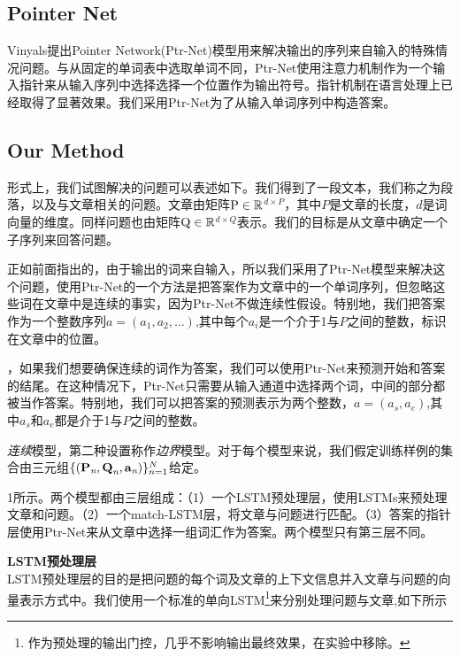 \documentclass{article}
\begin{document}
\begin{CJK*}{UTF8}{gbsn}
\begin{figure*}[!thbp]
    \end{figure*}
    
    \subsection{Pointer Net}
    Vinyals提出Pointer Network(Ptr-Net)模型用来解决输出的序列来自输入的特殊情况问题。与从固定的单词表中选取单词不同，Ptr-Net使用注意力机制作为一个输入指针来从输入序列中选择选择一个位置作为输出符号。指针机制在语言处理上已经取得了显著效果。我们采用Ptr-Net为了从输入单词序列中构造答案。

    \subsection{Our Method}
    形式上，我们试图解决的问题可以表述如下。我们得到了一段文本，我们称之为段落，以及与文章相关的问题。文章由矩阵$\rm P \in \mathbb{R}$$^{d \times P}$，其中$P$是文章的长度，$d$是词向量的维度。同样问题也由矩阵$\rm Q \in \mathbb{R}$$^{d \times Q}$表示。我们的目标是从文章中确定一个子序列来回答问题。

    正如前面指出的，由于输出的词来自输入，所以我们采用了Ptr-Net模型来解决这个问题，使用Ptr-Net的一个方法是把答案作为文章中的一个单词序列，但忽略这些词在文章中是连续的事实，因为Ptr-Net不做连续性假设。特别地，我们把答案作为一个整数序列$a=(a_{1},a_{2},\ldots)$,其中每个$a_{i}$是一个介于1与$P$之间的整数，标识在文章中的位置。

    \vspace{1ex}        
    ，如果我们想要确保连续的词作为答案，我们可以使用Ptr-Net来预测开始和答案的结尾。在这种情况下，Ptr-Net只需要从输入通道中选择两个词，中间的部分都被当作答案。特别地，我们可以把答案的预测表示为两个整数，$a=(a_{s},a_{e})$,其中$a_{s}$和$a_{e}$都是介于1与$P$之间的整数。

    \vspace{1ex}
    \emph{连续}模型，第二种设置称作\emph{边界}模型。对于每个模型来说，我们假定训练样例的集合由三元组$\{({\rm {\textbf P}_{\emph n}, {\textbf Q}_{\emph n}, {\textbf a}_{\emph n}})\}^{N}_{n=1}$给定。

    \vspace{1ex}
    1所示。两个模型都由三层组成：（1）一个LSTM预处理层，使用LSTMs来预处理文章和问题。（2）一个match-LSTM层，将文章与问题进行匹配。（3）答案的指针层使用Ptr-Net来从文章中选择一组词汇作为答案。两个模型只有第三层不同。

    \vspace{2ex}
    \noindent\textbf{LSTM预处理层}\\
    \vspace{1px}
    \noindent LSTM预处理层的目的是把问题的每个词及文章的上下文信息并入文章与问题的向量表示方式中。我们使用一个标准的单向LSTM\footnote{作为预处理的输出门控，几乎不影响输出最终效果，在实验中移除。}来分别处理问题与文章,如下所示


\end{CJK*}
\end{document}
